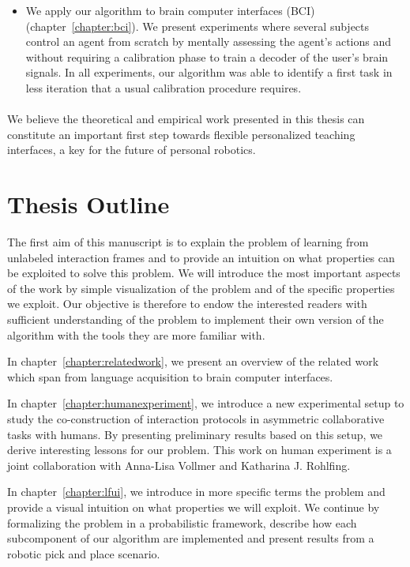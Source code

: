 \begin{itemize}
\item We apply our algorithm to brain computer interfaces (BCI) \cite{grizou2013zero,grizou2014calibration} (chapter~\ref{chapter:bci}). We present experiments where several subjects control an agent from scratch by mentally assessing the agent's actions and without requiring a calibration phase to train a decoder of the user's brain signals. In all experiments, our algorithm was able to identify a first task in less iteration that a usual calibration procedure requires.

\end{itemize}

\paragraph{} We believe the theoretical and empirical work presented in this thesis can constitute an important first step towards flexible personalized teaching interfaces, a key for the future of personal robotics.

\section{Thesis Outline}

The first aim of this manuscript is to explain the problem of learning from unlabeled interaction frames and to provide an intuition on what properties can be exploited to solve this problem. We will introduce the most important aspects of the work by simple visualization of the problem and of the specific properties we exploit. Our objective is therefore to endow the interested readers with sufficient understanding of the problem to implement their own version of the algorithm with the tools they are more familiar with.

In chapter~\ref{chapter:relatedwork}, we present an overview of the related work which span from language acquisition to brain computer interfaces.

In chapter~\ref{chapter:humanexperiment}, we introduce a new experimental setup to study the co-construction of interaction protocols in asymmetric collaborative tasks with humans. By presenting preliminary results based on this setup, we derive interesting lessons for our problem. This work on human experiment is a joint collaboration with Anna-Lisa Vollmer and Katharina J. Rohlfing.

In chapter~\ref{chapter:lfui}, we introduce in more specific terms the problem and provide a visual intuition on what properties we will exploit. We continue by formalizing the problem in a probabilistic framework, describe how each subcomponent of our algorithm are implemented and present results from a robotic pick and place scenario.

